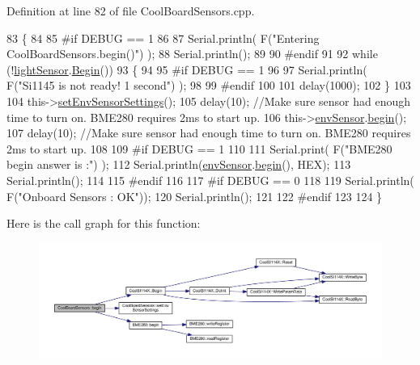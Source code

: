Definition at line 82 of file Cool\+Board\+Sensors.\+cpp.


\begin{DoxyCode}
83 \{  
84 
85 \textcolor{preprocessor}{#if DEBUG == 1 }
86      
87     Serial.println( F(\textcolor{stringliteral}{"Entering CoolBoardSensors.begin()"}) );
88     Serial.println();
89 
90 \textcolor{preprocessor}{#endif}
91 
92     \textcolor{keywordflow}{while} (!\hyperlink{class_cool_board_sensors_ac711c27d0927eb5e73be77f092c48be0}{lightSensor}.\hyperlink{class_cool_s_i114_x_a206b36aca7049f63be1d11088c30a09f}{Begin}()) 
93     \{
94     
95 \textcolor{preprocessor}{    #if DEBUG == 1}
96 
97         Serial.println( F(\textcolor{stringliteral}{"Si1145 is not ready!  1 second"}) );
98 
99 \textcolor{preprocessor}{    #endif}
100 
101         delay(1000);
102     \}
103      
104     this->\hyperlink{class_cool_board_sensors_a406307ffd70272282d91479c7ed8d66f}{setEnvSensorSettings}();
105     delay(10);  \textcolor{comment}{//Make sure sensor had enough time to turn on. BME280 requires 2ms to start up.}
106     this->\hyperlink{class_cool_board_sensors_a868e38985e9a2412829fa2790ca13e2e}{envSensor}.\hyperlink{class_b_m_e280_a994c102f010547f9c740a338ef9905c7}{begin}();
107     delay(10);  \textcolor{comment}{//Make sure sensor had enough time to turn on. BME280 requires 2ms to start up.}
108 
109 \textcolor{preprocessor}{#if DEBUG == 1 }
110     
111     Serial.print( F(\textcolor{stringliteral}{"BME280 begin answer is :"}) );
112     Serial.println(\hyperlink{class_cool_board_sensors_a868e38985e9a2412829fa2790ca13e2e}{envSensor}.\hyperlink{class_b_m_e280_a994c102f010547f9c740a338ef9905c7}{begin}(), HEX);
113     Serial.println();
114 
115 \textcolor{preprocessor}{#endif}
116 
117 \textcolor{preprocessor}{#if DEBUG == 0}
118 
119     Serial.println( F(\textcolor{stringliteral}{"Onboard Sensors : OK"}));
120     Serial.println();
121 
122 \textcolor{preprocessor}{#endif}
123 
124 \}
\end{DoxyCode}
Here is the call graph for this function\+:\nopagebreak
\begin{figure}[H]
\begin{center}
\leavevmode
\includegraphics[width=350pt]{de/d46/class_cool_board_sensors_a97095823ef7c8f5290812f1405b966b3_cgraph}
\end{center}
\end{figure}
